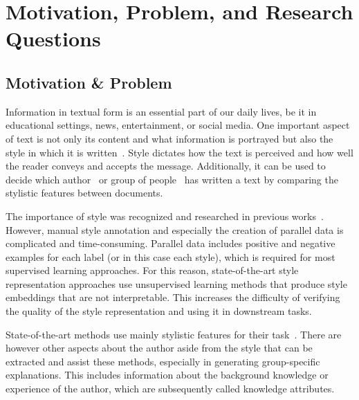 
\section{Motivation, Problem, and Research Questions}

\subsection{Motivation \& Problem}
Information in textual form is an essential part of our daily lives, be it in educational settings, news, entertainment, or social media. One important aspect of text is not only its content and what information is portrayed but also the style in which it is written~\cite{wegmannSameAuthorJust2022}. Style dictates how the text is perceived and how well the reader conveys and accepts the message. Additionally, it can be used to decide which author~\cite{alshomaryLatentSpaceInterpretation2024} or group of people~\cite{10.1007/978-3-642-29047-3_27} has written a text by comparing the stylistic features between documents.

The importance of style was recognized and researched in previous works~\cite{zhu-etal-2024-styleflow, ijcai2020p526,wegmannSameAuthorJust2022}. However, manual style annotation and especially the creation of parallel data is complicated and time-consuming. Parallel data includes positive and negative examples for each label (or in this case each style), which is required for most supervised learning approaches. For this reason, state-of-the-art style representation approaches use unsupervised learning methods that produce style embeddings that are not interpretable. This increases the difficulty of verifying the quality of the style representation and using it in downstream tasks.

State-of-the-art methods use mainly stylistic features for their task~\cite{alshomaryLatentSpaceInterpretation2024,patelLearningInterpretableStyle2023,konenStyleVectorsSteering2024,zhu-etal-2024-styleflow}. There are however other aspects about the author aside from the style that can be extracted and assist these methods, especially in generating group-specific explanations. This includes information about the background knowledge or experience of the author, which are subsequently called knowledge attributes.

